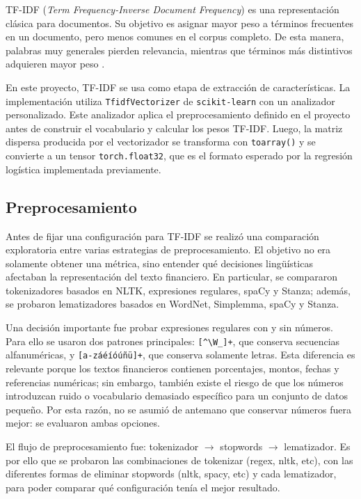 \documentclass[12pt]{article}
\begin{document}
TF-IDF (\textit{Term Frequency-Inverse Document Frequency}) es una representación clásica para documentos. Su objetivo es asignar mayor peso a términos frecuentes en un documento, pero menos comunes en el corpus completo. De esta manera, palabras muy generales pierden relevancia, mientras que términos más distintivos adquieren mayor peso \cite{nlp2026}.

En este proyecto, TF-IDF se usa como etapa de extracción de características. La implementación utiliza \texttt{TfidfVectorizer} de \texttt{scikit-learn} con un analizador personalizado. Este analizador aplica el preprocesamiento definido en el proyecto antes de construir el vocabulario y calcular los pesos TF-IDF. Luego, la matriz dispersa producida por el vectorizador se transforma con \texttt{toarray()} y se convierte a un tensor \texttt{torch.float32}, que es el formato esperado por la regresión logística implementada previamente.

\subsection{Preprocesamiento}

Antes de fijar una configuración para TF-IDF se realizó una comparación exploratoria entre varias estrategias de preprocesamiento. El objetivo no era solamente obtener una métrica, sino entender qué decisiones lingüísticas afectaban la representación del texto financiero. En particular, se compararon tokenizadores basados en NLTK, expresiones regulares, spaCy y Stanza; además, se probaron lematizadores basados en WordNet, Simplemma, spaCy y Stanza.

Una decisión importante fue probar expresiones regulares con y sin números. Para ello se usaron dos patrones principales: \texttt{[\textasciicircum\textbackslash W\_]+}, que conserva secuencias alfanuméricas, y \texttt{[a-záéíóúñü]+}, que conserva solamente letras. Esta diferencia es relevante porque los textos financieros contienen porcentajes, montos, fechas y referencias numéricas; sin embargo, también existe el riesgo de que los números introduzcan ruido o vocabulario demasiado específico para un conjunto de datos pequeño. Por esta razón, no se asumió de antemano que conservar números fuera mejor: se evaluaron ambas opciones.

El flujo de preprocesamiento fue: tokenizador $\rightarrow$ stopwords $\rightarrow$ lematizador. Es por ello que se probaron las combinaciones de tokenizar (regex, nltk, etc), con las diferentes formas de eliminar stopwords (nltk, spacy, etc) y cada lematizador, para poder comparar qué configuración tenía el mejor resultado.
\end{document}
